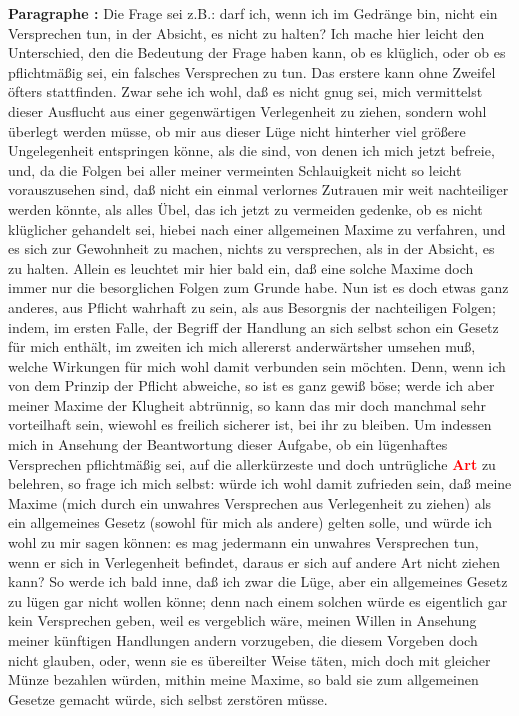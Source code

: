 \documentclass[a4paper,12pt,twoside]{book}
\newcommand{\match}[1]{\textcolor{red}{\textbf{#1}}}
\begin{document}
	\noindent\textbf{Paragraphe : }Die Frage sei z.B.: darf ich, wenn ich im Gedränge bin, nicht ein Versprechen tun, in der Absicht, es nicht zu halten? Ich mache hier leicht den Unterschied, den die Bedeutung der Frage haben kann, ob es klüglich, oder ob es pflichtmäßig sei, ein falsches Versprechen zu tun. Das erstere kann ohne Zweifel öfters stattfinden. Zwar sehe ich wohl, daß es nicht gnug sei, mich vermittelst dieser Ausflucht aus einer gegenwärtigen Verlegenheit zu ziehen, sondern wohl überlegt werden müsse, ob mir aus dieser Lüge nicht hinterher viel größere Ungelegenheit entspringen könne, als die sind, von denen ich mich jetzt befreie, und, da die Folgen bei aller meiner vermeinten Schlauigkeit nicht so leicht vorauszusehen sind, daß nicht ein einmal verlornes Zutrauen mir weit nachteiliger werden könnte, als alles Übel, das ich jetzt zu vermeiden gedenke, ob es nicht klüglicher gehandelt sei, hiebei nach einer allgemeinen Maxime zu verfahren, und es sich zur Gewohnheit zu machen, nichts zu versprechen, als in der Absicht, es zu halten. Allein es leuchtet mir hier bald ein, daß eine solche Maxime doch immer nur die besorglichen Folgen zum Grunde habe. Nun ist es doch etwas ganz anderes, aus Pflicht wahrhaft zu sein, als aus Besorgnis der nachteiligen Folgen; indem, im ersten Falle, der Begriff der Handlung an sich selbst schon ein Gesetz für mich enthält, im zweiten ich mich allererst anderwärtsher umsehen muß, welche Wirkungen für mich wohl damit verbunden sein möchten. Denn, wenn ich von dem Prinzip der Pflicht abweiche, so ist es ganz gewiß böse; werde ich aber meiner Maxime der Klugheit abtrünnig, so kann das mir doch manchmal sehr vorteilhaft sein, wiewohl es freilich sicherer ist, bei ihr zu bleiben. Um indessen mich in Ansehung der Beantwortung dieser Aufgabe, ob ein lügenhaftes Versprechen pflichtmäßig sei, auf die allerkürzeste und doch untrügliche \match{Art} zu belehren, so frage ich mich selbst: würde ich wohl damit zufrieden sein, daß meine Maxime (mich durch ein unwahres Versprechen aus Verlegenheit zu  ziehen) als ein allgemeines Gesetz (sowohl für mich als andere) gelten solle, und würde ich wohl zu mir sagen können: es mag jedermann ein unwahres Versprechen tun, wenn er sich in Verlegenheit befindet, daraus er sich auf andere Art nicht ziehen kann? So werde ich bald inne, daß ich zwar die Lüge, aber ein allgemeines Gesetz zu lügen gar nicht wollen könne; denn nach einem solchen würde es eigentlich gar kein Versprechen geben, weil es vergeblich wäre, meinen Willen in Ansehung meiner künftigen Handlungen andern vorzugeben, die diesem Vorgeben doch nicht glauben, oder, wenn sie es übereilter Weise täten, mich doch mit gleicher Münze bezahlen würden, mithin meine Maxime, so bald sie zum allgemeinen Gesetze gemacht würde, sich selbst zerstören müsse. 
	
\end{document}
